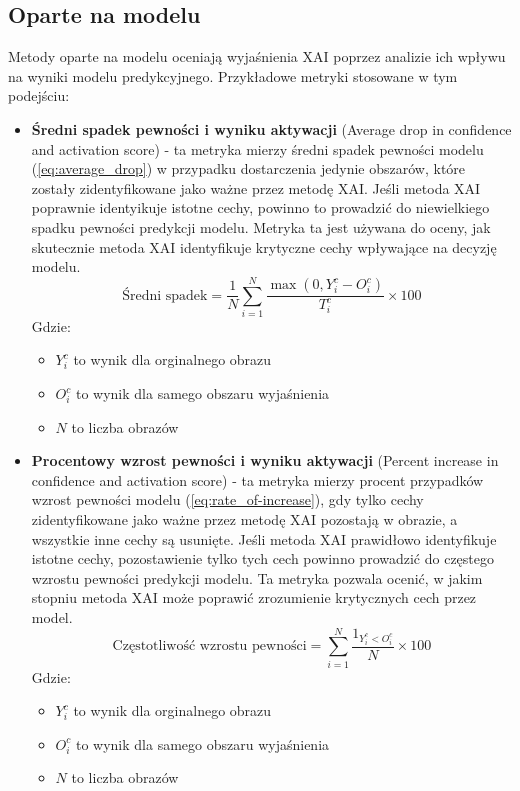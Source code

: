 \subsection*{Oparte na modelu}
Metody oparte na modelu oceniają wyjaśnienia XAI poprzez analizie ich wpływu na wyniki modelu predykcyjnego.
Przykładowe metryki stosowane w tym podejściu:
\begin{itemize}
	\item \textbf{Średni spadek pewności i wyniku aktywacji} (Average drop in confidence and activation score) - ta metryka mierzy średni spadek pewności modelu (\ref{eq:average_drop}) w przypadku dostarczenia jedynie obszarów, które zostały zidentyfikowane jako ważne przez metodę XAI.
	      Jeśli metoda XAI poprawnie identyikuje istotne cechy, powinno to prowadzić do niewielkiego spadku pewności predykcji modelu.
	      Metryka ta jest używana do oceny, jak skutecznie metoda XAI identyfikuje krytyczne cechy wpływające na decyzję modelu.
	      \begin{equation}
		      \text{Średni spadek} = \frac{1}{N} \sum_{i=1}^{N} \frac{\max(0,Y_i^c-O_i^c)}{T_i^c} \times 100
		      \label{eq:average_drop}
	      \end{equation}
	      Gdzie:
	      \begin{itemize}[label=]
		      \item $Y_i^c$ to wynik dla orginalnego obrazu
		      \item $O_i^c$ to wynik dla samego obszaru wyjaśnienia
		      \item $N$ to liczba obrazów
	      \end{itemize}
	\item \textbf{Procentowy wzrost pewności i wyniku aktywacji} (Percent increase in confidence and activation score) - ta metryka mierzy procent przypadków wzrost pewności modelu (\ref{eq:rate_of-increase}), gdy tylko cechy zidentyfikowane jako ważne przez metodę XAI pozostają w obrazie, a wszystkie inne cechy są usunięte.
	      Jeśli metoda XAI prawidłowo identyfikuje istotne cechy, pozostawienie tylko tych cech powinno prowadzić do częstego wzrostu pewności predykcji modelu.
	      Ta metryka pozwala ocenić, w jakim stopniu metoda XAI może poprawić zrozumienie krytycznych cech przez model.
	      \begin{equation}
		      \text{Częstotliwość wzrostu pewności} =  \sum_{i=1}^{N} \frac{1_{Y_i^c<O_i^c}}{N} \times 100
		      \label{eq:rate_of-increase}
	      \end{equation}
	      Gdzie:
	      \begin{itemize}[label=]
		      \item $Y_i^c$ to wynik dla orginalnego obrazu
		      \item $O_i^c$ to wynik dla samego obszaru wyjaśnienia
		      \item $N$ to liczba obrazów
	      \end{itemize}
\end{itemize}

